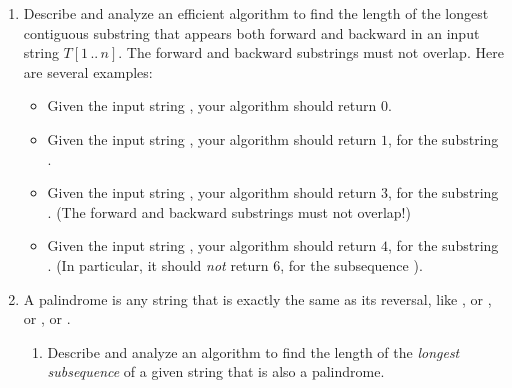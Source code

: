 \begin{enumerate}[label=\arabic*.,ref=\thechapter.\arabic*,leftmargin=*,align=left,widest*=99,itemsep=1.5ex plus 0.5ex]
\item Describe and analyze an efficient algorithm to find the length of the longest contiguous substring that appears both forward and backward in an input string $T[1\,..\,n]$.
The forward and backward substrings must not overlap.
Here are several examples:
\begin{itemize}
\item Given the input string , your algorithm should return $0$.
\item Given the input string , your algorithm should return $1$, for the substring .
\item Given the input string , your algorithm should return $3$, for the substring .
(The forward and backward substrings must not overlap!)
\item Given the input string , your algorithm should return $4$, for the substring .
(In particular, it should \textit{not} return $6$, for the subsequence ).
\end{itemize}

\item A palindrome is any string that is exactly the same as its reversal, like , or , or , or .
\begin{enumerate}
\item Describe and analyze an algorithm to find the length of the \textit{longest subsequence} of a given string that is also a palindrome.


\end{enumerate}
\end{enumerate}
